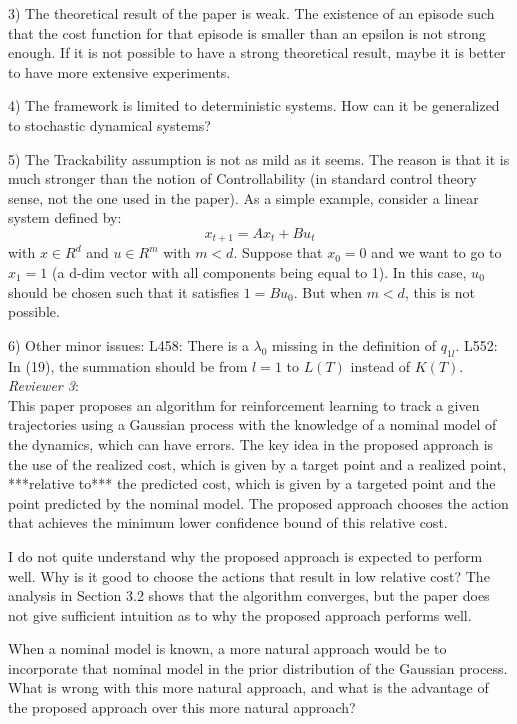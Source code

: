 \documentclass[10pt,a4paper]{article}
\begin{document}
3) The theoretical result of the paper is weak. The existence of an episode such that the cost function for that episode is smaller than an epsilon is not strong enough. If it is not possible to have a strong theoretical result, maybe it is better to have more extensive experiments.

4) The framework is limited to deterministic systems. How can it be generalized to stochastic dynamical systems?

5) The Trackability assumption is not as mild as it seems. The reason is that it is much stronger than the notion of Controllability (in standard control theory sense, not the one used in the paper). As a simple example, consider a linear system defined by:
\begin{equation}
x_{t+1} = A x_t + B u_t
\end{equation}
with $x \in R^d$ and $u \in R^m$ with $m < d$.
Suppose that $x_0 = 0$ and we want to go to $x_1 = 1$ (a d-dim vector with all components being equal to 1). In this case, $u_0$ should be chosen such that it satisfies $1 = B u_0$. But when $m < d$, this is not possible.

6) Other minor issues: L458: There is a $\lambda_0$ missing in the definition of $q_{1l}$. L552: In (19), the summation should be from $l = 1$ to $L(T)$ instead of $K(T)$. \\

\emph{Reviewer 3}: \\

This paper proposes an algorithm for reinforcement learning to track a given trajectories using a Gaussian process with the knowledge of a nominal model of the dynamics, which can have errors. The key idea in the proposed approach is the use of the realized cost, which is given by a target point and a realized point, ***relative to*** the predicted cost, which is given by a targeted point and the point predicted by the nominal model. The proposed approach chooses the action that achieves the minimum lower confidence bound of this relative cost.

I do not quite understand why the proposed approach is expected to perform well. Why is it good to choose the actions that result in low relative cost? The analysis in Section 3.2 shows that the algorithm converges, but the paper does not give sufficient intuition as to why the proposed approach performs well.

When a nominal model is known, a more natural approach would be to incorporate that nominal model in the prior distribution of the Gaussian process. What is wrong with this more natural approach, and what is the advantage of the proposed approach over this more natural approach?
\end{document}
